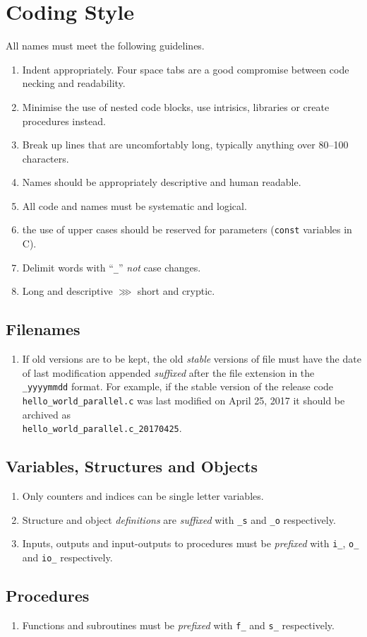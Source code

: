 \section{Coding Style}\label{c:best_practices:s:naming_conventions}
All names must meet the following guidelines.
\begin{enumerate}
	\item Indent appropriately. Four space tabs are a good compromise between code necking and readability.
	\item Minimise the use of nested code blocks, use intrisics, libraries or create procedures instead.
	\item Break up lines that are uncomfortably long, typically anything over 80--100 characters.
	\item Names should be appropriately descriptive and human readable.
	\item All code and names must be systematic and logical.
	\item the use of upper cases should be reserved for parameters (\texttt{const} variables in C).
	\item Delimit words with ``\texttt{\_}'' \emph{not} case changes.
	\item Long and descriptive $\ggg$ short and cryptic.
\end{enumerate}
\subsection{Filenames}\label{c:best_practices:s:naming_conventions:ss:filenames}
\begin{enumerate}
	\item If old versions are to be kept, the old \emph{stable} versions of file must have the date of last modification appended \emph{suffixed} after the file extension in the \texttt{\_yyyymmdd} format. For example, if the stable version of the release code \texttt{hello\_world\_parallel.c} was last modified on April 25, 2017 it should be archived as\\ \texttt{hello\_world\_parallel.c\_20170425}.
\end{enumerate}
\subsection{Variables, Structures and Objects}\label{c:best_practices:s:naming_conventions:ss:variables_structures_objects}
\begin{enumerate}
	\item Only counters and indices can be single letter variables.
	\item Structure and object \emph{definitions} are \emph{suffixed} with \texttt{\_s} and \texttt{\_o} respectively.
	\item Inputs, outputs and input-outputs to procedures must be \emph{prefixed} with \texttt{i\_}, \texttt{o\_} and \texttt{io\_} respectively.
\end{enumerate}
\subsection{Procedures}\label{c:best_practices:s:naming_conventions:ss:procedures}
\begin{enumerate}
	\item Functions and subroutines must be \emph{prefixed} with \texttt{f\_} and \texttt{s\_} respectively.
\end{enumerate}